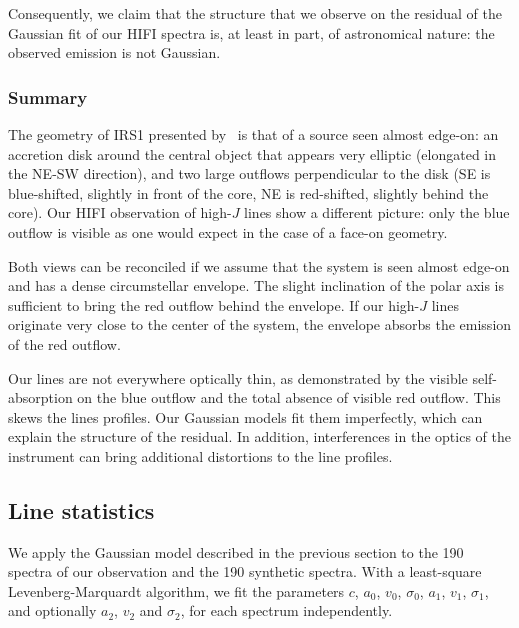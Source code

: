 Consequently, we claim that the structure that we observe on the residual of the Gaussian fit of our HIFI spectra is, at least in part, of astronomical nature: the observed emission is not Gaussian.




\subsubsection{Summary}
The geometry of IRS1 presented by~\textcite{maud2013s140} is that of a source seen almost edge-on: an accretion disk around the central object that appears very elliptic (elongated in the NE-SW direction), and two large  outflows perpendicular to the disk (SE is blue-shifted, slightly in front of the core, NE is red-shifted, slightly behind the core).
Our HIFI observation of high-$J$  lines show a different picture: only the blue outflow is visible as one would expect in the case of a face-on geometry.

Both views can be reconciled if we assume that the system is seen almost edge-on and has a dense circumstellar envelope.
The slight inclination of the polar axis is sufficient to bring the red outflow behind the envelope.
If our high-$J$  lines originate very close to the center of the system,
the envelope absorbs the emission of the red outflow.

Our lines are not everywhere optically thin, as demonstrated by the visible self-absorption on the blue outflow and the total absence of visible red outflow.
This skews the lines profiles.
Our Gaussian models fit them imperfectly, which can explain the structure of the residual.
In addition, interferences in the optics of the instrument can bring additional distortions to the line profiles.


\FloatBarrier
\subsection{Line statistics}
We apply the Gaussian model described in the previous section to the 190 spectra of our observation and the 190 synthetic spectra.
With a least-square Levenberg-Marquardt algorithm, we fit the parameters
$c$,
$a_0$, $v_0$, $\sigma_0$,
$a_1$, $v_1$, $\sigma_1$, and optionally
$a_2$, $v_2$ and $\sigma_2$, for each spectrum independently.

